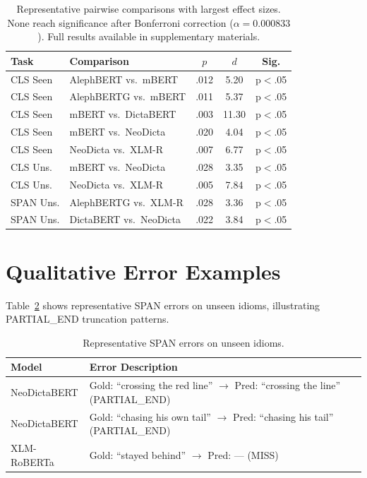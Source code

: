 \documentclass[11pt]{article}
\begin{document}
\begin{table}[h]
\centering
\small
\setlength{\tabcolsep}{3pt}
\renewcommand{\arraystretch}{0.95}
\begin{tabularx}{\linewidth}{@{}l X c c c@{}}
\toprule
\textbf{Task} & \textbf{Comparison} & \textbf{$p$} & \textbf{$d$} & \textbf{Sig.} \\
\midrule
CLS Seen & AlephBERT vs.\ mBERT & .012 & 5.20 & {\tiny p$<$.05} \\
CLS Seen & AlephBERTG vs.\ mBERT & .011 & 5.37 & {\tiny p$<$.05} \\
CLS Seen & mBERT vs.\ DictaBERT & .003 & 11.30 & {\tiny p$<$.05} \\
CLS Seen & mBERT vs.\ NeoDicta & .020 & 4.04 & {\tiny p$<$.05} \\
CLS Seen & NeoDicta vs.\ XLM-R & .007 & 6.77 & {\tiny p$<$.05} \\
\midrule
CLS Uns. & mBERT vs.\ NeoDicta & .028 & 3.35 & {\tiny p$<$.05} \\
CLS Uns. & NeoDicta vs.\ XLM-R & .005 & 7.84 & {\tiny p$<$.05} \\
\midrule
SPAN Uns. & AlephBERTG vs.\ XLM-R & .028 & 3.36 & {\tiny p$<$.05} \\
SPAN Uns. & DictaBERT vs.\ NeoDicta & .022 & 3.84 & {\tiny p$<$.05} \\
\bottomrule
\end{tabularx}
\caption{Representative pairwise comparisons with largest effect sizes. None reach significance after Bonferroni correction ($\alpha = 0.000833$). Full results available in supplementary materials.}
\label{tab:stat_tests}
\end{table}

\section{Qualitative Error Examples}
\label{sec:appendix_errors}

Table~\ref{tab:error_examples} shows representative SPAN errors on unseen idioms, illustrating PARTIAL\_END truncation patterns.

\begin{table}[h]
\centering
\small
\begin{tabular}{p{2cm}p{4.5cm}}
\toprule
\textbf{Model} & \textbf{Error Description} \\
\midrule
NeoDictaBERT & Gold: ``crossing the red line'' $\rightarrow$ Pred: ``crossing the line'' (PARTIAL\_END) \\
NeoDictaBERT & Gold: ``chasing his own tail'' $\rightarrow$ Pred: ``chasing his tail'' (PARTIAL\_END) \\
XLM-RoBERTa & Gold: ``stayed behind'' $\rightarrow$ Pred: --- (MISS) \\
\bottomrule
\end{tabular}
\caption{Representative SPAN errors on unseen idioms.}
\label{tab:error_examples}
\end{table}
\end{document}
